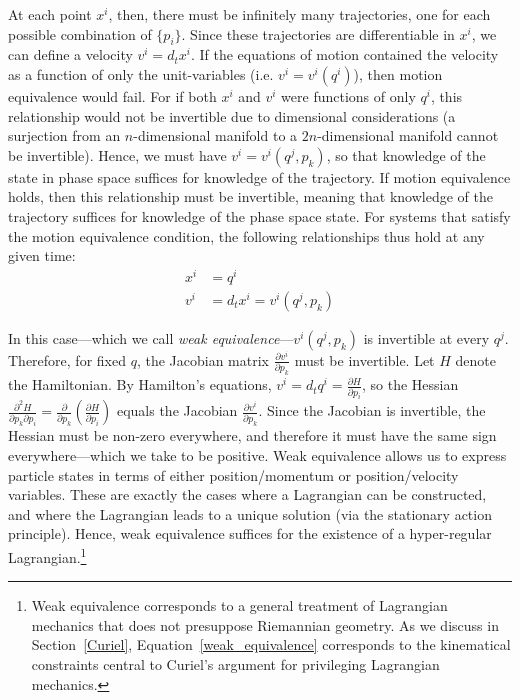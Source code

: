 \documentclass[12pt, twoside]{article}
\begin{document}
At each point $x^i$, then, there must be infinitely many trajectories, one for each possible combination of $\{p_i\}$. Since these trajectories are differentiable in $x^i$, we can define a velocity $v^i = d_t x^i$. If the equations of motion contained the velocity as a function of only the unit-variables (i.e. $v^i=v^i(q^i)$), then motion equivalence would fail. For if both $x^i$ and $v^i$ were functions of only $q^i$, this relationship would not be invertible due to dimensional considerations (a surjection from an $n$-dimensional manifold to a $2n$-dimensional manifold cannot be invertible). Hence, we must have $v^i=v^i(q^j, p_k)$, so that knowledge of the state in phase space suffices for knowledge of the trajectory. If motion equivalence holds, then this relationship must be invertible, meaning that knowledge of the trajectory suffices for knowledge of the phase space state. For systems that satisfy the motion equivalence condition, the following relationships thus hold at any given time:
\begin{equation}\label{weak_equivalence}
\begin{aligned}
x^i &= q^i \\
v^i &= d_t x^i = v^i(q^j, p_k)
\end{aligned}
\end{equation}

In this case---which we call \textit{weak equivalence}---$v^i(q^j, p_k)$ is invertible at every $q^j$. Therefore, for fixed $q$, the Jacobian matrix  $\frac{\partial v^i}{\partial p_k}$ must be invertible. Let $H$ denote the Hamiltonian. By Hamilton's equations, $v^i = d_t q^i = \frac{\partial H}{\partial p_i}$, so the Hessian $\frac{\partial^2 H}{\partial p_k \partial p_i} = \frac{\partial}{\partial p_k} (\frac{\partial H}{\partial p_i})$ equals the Jacobian $\frac{\partial v^i}{\partial p_k}$. Since the Jacobian is invertible, the Hessian must be non-zero everywhere, and therefore it must have the same sign everywhere---which we take to be positive. Weak equivalence allows us to express particle states in terms of either position/momentum or position/velocity variables. These are exactly the cases where a Lagrangian can be constructed, and where the Lagrangian leads to a unique solution (via the stationary action principle). Hence, weak equivalence suffices for the existence of a hyper-regular Lagrangian.\footnote{Weak equivalence corresponds to a general treatment of Lagrangian mechanics that does not presuppose Riemannian geometry. As we discuss in Section~\ref{Curiel}, Equation~\ref{weak_equivalence} corresponds to the kinematical constraints central to Curiel's \parencites*[]{Curiel} argument for privileging Lagrangian mechanics.}
\end{document}
